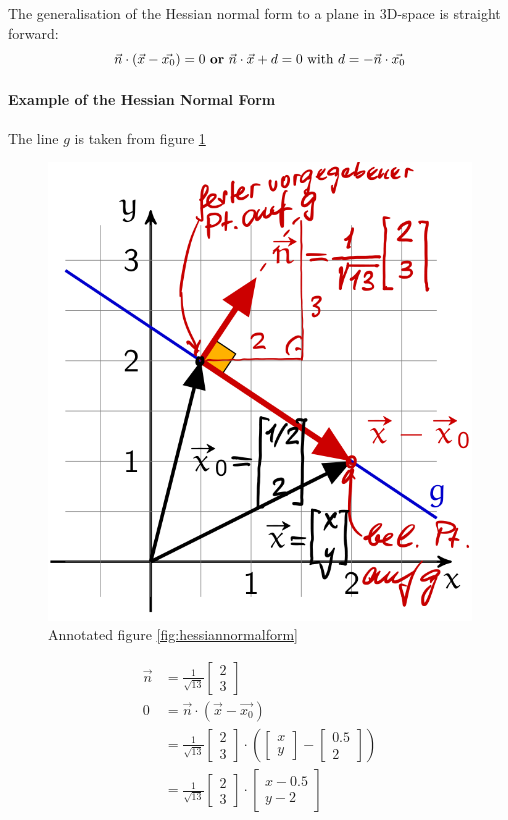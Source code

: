 \documentclass[11pt]{article}
\begin{document}
The generalisation of the Hessian normal form to a plane in 3D-space is straight forward:
\begin{equation}
    \vec{n}\cdot(\vec{x} - \vec{x_0}) = 0 \text{ \textbf{or} } \vec{n}\cdot\vec{x} + d = 0\text{ with } d = -\vec{n}\cdot\vec{x_0}
\end{equation}

\paragraph{Example of the Hessian Normal Form}
The line $g$ is taken from figure \ref{fig:hessiannormalformexample}

\begin{figure}[tbh!]
    \centering
    \includegraphics[width=0.5\linewidth, keepaspectratio]{Pictures/hessian_normal_form_example}
    \caption{Annotated figure \ref{fig:hessiannormalform}}
    \label{fig:hessiannormalformexample}
\end{figure}

\begin{align*}
    \vec{n} & = \frac{1}{\sqrt{13}} \begin{bmatrix}2\\3\end{bmatrix}                                                                  \\
    0       & = \vec{n}\cdot(\vec{x}-\vec{x_0})                                                                                  \\
            & = \frac{1}{\sqrt{13}} \begin{bmatrix}2\\3\end{bmatrix} \cdot(\begin{bmatrix}x\\y\end{bmatrix} - \begin{bmatrix}0.5\\2\end{bmatrix}) \\
            & = \frac{1}{\sqrt{13}} \begin{bmatrix}2\\3\end{bmatrix} \cdot \begin{bmatrix}x - 0.5\\ y - 2\end{bmatrix}
\end{align*}
\end{document}
